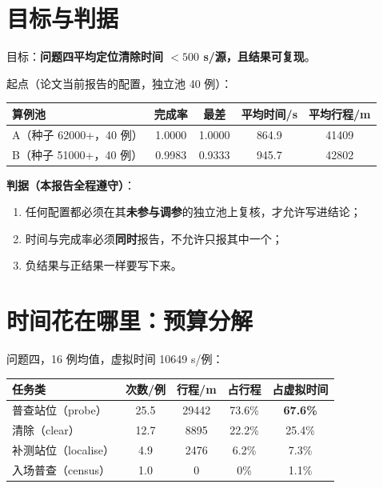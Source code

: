 \section{目标与判据}

目标：\textbf{问题四平均定位清除时间 $<500$ s/源，且结果可复现}。

起点（论文当前报告的配置，独立池 40 例）：
\begin{center}
\begin{tabular}{lcccc}
\toprule
算例池 & 完成率 & 最差 & 平均时间/s & 平均行程/m \\ \midrule
A（种子 62000+，40 例） & 1.0000 & 1.0000 & 864.9 & 41409 \\
B（种子 51000+，40 例） & 0.9983 & 0.9333 & 945.7 & 42802 \\
\bottomrule
\end{tabular}
\end{center}

\textbf{判据（本报告全程遵守）}：
\begin{enumerate}[leftmargin=1.8em]
  \item 任何配置都必须在其\textbf{未参与调参}的独立池上复核，才允许写进结论；
  \item 时间与完成率必须\textbf{同时}报告，不允许只报其中一个；
  \item 负结果与正结果一样要写下来。
\end{enumerate}

\section{时间花在哪里：预算分解}

问题四，16 例均值，虚拟时间 10649 s/例：

\begin{center}
\begin{tabular}{lcccc}
\toprule
任务类 & 次数/例 & 行程/m & 占行程 & 占虚拟时间 \\ \midrule
普查站位（probe） & 25.5 & 29442 & 73.6\% & \textbf{67.6\%} \\
清除（clear） & 12.7 & 8895 & 22.2\% & 25.4\% \\
补测站位（localise） & 4.9 & 2476 & 6.2\% & 7.3\% \\
入场普查（census） & 1.0 & 0 & 0\% & 1.1\% \\
\bottomrule
\end{tabular}
\end{center}

